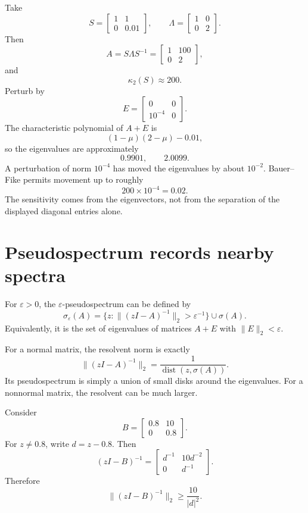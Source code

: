 Take
\[
  S=
  \begin{bmatrix}
    1&1\\
    0&0.01
  \end{bmatrix},
  \qquad
  \Lambda=
  \begin{bmatrix}
    1&0\\
    0&2
  \end{bmatrix}.
\]
Then
\[
  A=S\Lambda S^{-1}
  =
  \begin{bmatrix}
    1&100\\
    0&2
  \end{bmatrix},
\]
and
\[
  \kappa_2(S)\approx200.
\]
Perturb by
\[
  E=
  \begin{bmatrix}
    0&0\\
    10^{-4}&0
  \end{bmatrix}.
\]
The characteristic polynomial of \(A+E\) is
\[
  (1-\mu)(2-\mu)-0.01,
\]
so the eigenvalues are approximately
\[
  0.9901,
  \qquad
  2.0099.
\]
A perturbation of norm \(10^{-4}\) has moved the eigenvalues by about \(10^{-2}\).  Bauer--Fike permits movement up to roughly
\[
  200\times10^{-4}=0.02.
\]
The sensitivity comes from the eigenvectors, not from the separation of the displayed diagonal entries alone.

\section{Pseudospectrum records nearby spectra}

For \(\varepsilon>0\), the \(\varepsilon\)-pseudospectrum can be defined by
\[
  \sigma_\varepsilon(A)
  =\{z:\|(zI-A)^{-1}\|_2>\varepsilon^{-1}\}
  \cup\sigma(A).
\]
Equivalently, it is the set of eigenvalues of matrices \(A+E\) with \(\|E\|_2<\varepsilon\).

For a normal matrix, the resolvent norm is exactly
\[
  \|(zI-A)^{-1}\|_2
  =\frac1{\operatorname{dist}(z,\sigma(A))}.
\]
Its pseudospectrum is simply a union of small disks around the eigenvalues.  For a nonnormal matrix, the resolvent can be much larger.

Consider
\[
  B=
  \begin{bmatrix}
    0.8&10\\
    0&0.8
  \end{bmatrix}.
\]
For \(z\ne0.8\), write \(d=z-0.8\).  Then
\[
  (zI-B)^{-1}
  =
  \begin{bmatrix}
    d^{-1}&10d^{-2}\\
    0&d^{-1}
  \end{bmatrix}.
\]
Therefore
\[
  \|(zI-B)^{-1}\|_2
  \ge\frac{10}{|d|^2}.
\]

